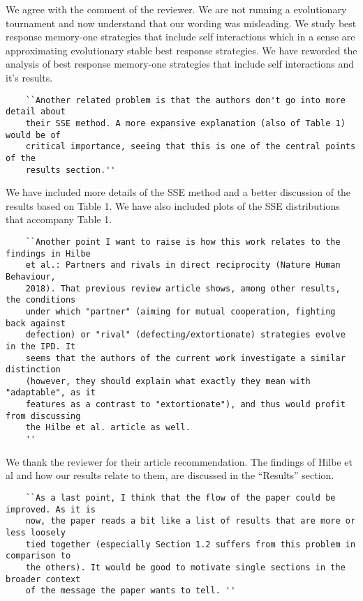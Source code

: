 \documentclass{article}
\begin{document}
We agree with the comment of the reviewer. We are not running a evolutionary %
tournament and now understand that our wording was misleading. We study best
response memory-one strategies that include self interactions which in a sense are
approximating evolutionary stable best response strategies. We have reworded
the analysis of best response memory-one strategies that include self interactions
and it's results.

\begin{verbatim}
    ``Another related problem is that the authors don't go into more detail about
    their SSE method. A more expansive explanation (also of Table 1) would be of
    critical importance, seeing that this is one of the central points of the
    results section.''
\end{verbatim}

We have included more details of the SSE method and a better
discussion of the results based on Table 1. We have also included plots of the
SSE distributions that accompany Table 1.

\begin{verbatim}
    ``Another point I want to raise is how this work relates to the findings in Hilbe
    et al.: Partners and rivals in direct reciprocity (Nature Human Behaviour,
    2018). That previous review article shows, among other results, the conditions
    under which "partner" (aiming for mutual cooperation, fighting back against
    defection) or "rival" (defecting/extortionate) strategies evolve in the IPD. It
    seems that the authors of the current work investigate a similar distinction
    (however, they should explain what exactly they mean with "adaptable", as it
    features as a contrast to "extortionate"), and thus would profit from discussing
    the Hilbe et al. article as well.
    ''
\end{verbatim}

We thank the reviewer for their article recommendation. The findings of Hilbe et
 al and how our results relate to them, are discussed in the ``Results'' section. %

\begin{verbatim}
    ``As a last point, I think that the flow of the paper could be improved. As it is
    now, the paper reads a bit like a list of results that are more or less loosely
    tied together (especially Section 1.2 suffers from this problem in comparison to
    the others). It would be good to motivate single sections in the broader context
    of the message the paper wants to tell. ''
\end{verbatim}
\end{document}
